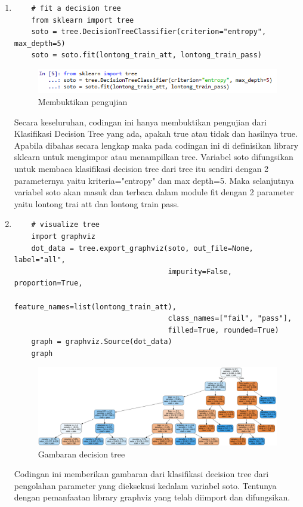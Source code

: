 \begin{enumerate}
\item 
\begin{verbatim}
	# fit a decision tree
	from sklearn import tree
	soto = tree.DecisionTreeClassifier(criterion="entropy", max_depth=5)
	soto = soto.fit(lontong_train_att, lontong_train_pass)
\end{verbatim}
\begin{figure}[ht]
\centering
\includegraphics[scale=0.9]{figures/lontong/5.png}
\caption{Membuktikan pengujian}
\end{figure}
\par
	Secara keseluruhan, codingan ini hanya membuktikan pengujian dari Klasifikasi Decision Tree yang ada, apakah true atau tidak dan hasilnya true. Apabila dibahas secara lengkap maka pada codingan ini di definisikan library sklearn untuk mengimpor atau menampilkan tree. Variabel soto difungsikan untuk membaca klasifikasi decision tree dari tree itu sendiri dengan 2 parameternya yaitu kriteria="entropy" dan max depth=5. Maka selanjutnya variabel soto akan masuk dan terbaca dalam module fit dengan 2 parameter yaitu lontong trai att dan lontong train pass.

\item
\begin{verbatim}
	# visualize tree
	import graphviz
	dot_data = tree.export_graphviz(soto, out_file=None, label="all", 
									impurity=False, proportion=True,
	                                feature_names=list(lontong_train_att), 
									class_names=["fail", "pass"], 
	                                filled=True, rounded=True)
	graph = graphviz.Source(dot_data)
	graph
\end{verbatim}
\begin{figure}[ht]
\centering
\includegraphics[scale=0.3]{figures/lontong/6.png}
\caption{Gambaran decision tree}
\end{figure}
\par
	Codingan ini memberikan gambaran dari klasifikasi decision tree dari pengolahan parameter yang dieksekusi kedalam variabel soto. Tentunya dengan pemanfaatan library graphviz yang telah diimport dan difungsikan.


\end{enumerate}
